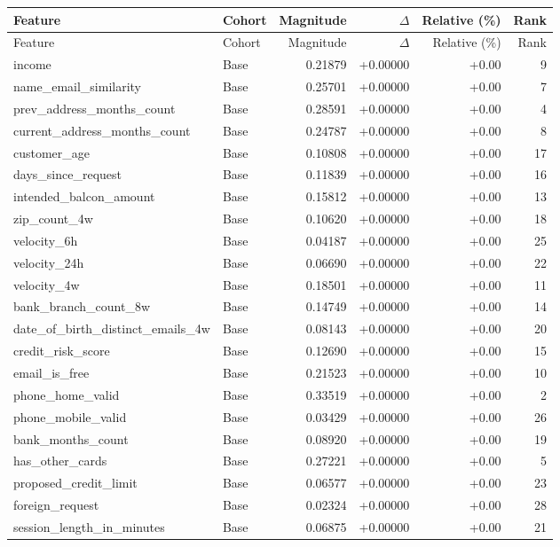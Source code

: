 \begin{longtable}{@{}llrrrr@{}}
\toprule
Feature & Cohort & Magnitude & $\Delta$ & Relative (\%) & Rank \\
\midrule
\endfirsthead
\toprule
Feature & Cohort & Magnitude & $\Delta$ & Relative (\%) & Rank \\
\midrule
\endhead
income & Base & 0.21879 & +0.00000 & +0.00 & 9 \\
name\_email\_similarity & Base & 0.25701 & +0.00000 & +0.00 & 7 \\
prev\_address\_months\_count & Base & 0.28591 & +0.00000 & +0.00 & 4 \\
current\_address\_months\_count & Base & 0.24787 & +0.00000 & +0.00 & 8 \\
customer\_age & Base & 0.10808 & +0.00000 & +0.00 & 17 \\
days\_since\_request & Base & 0.11839 & +0.00000 & +0.00 & 16 \\
intended\_balcon\_amount & Base & 0.15812 & +0.00000 & +0.00 & 13 \\
zip\_count\_4w & Base & 0.10620 & +0.00000 & +0.00 & 18 \\
velocity\_6h & Base & 0.04187 & +0.00000 & +0.00 & 25 \\
velocity\_24h & Base & 0.06690 & +0.00000 & +0.00 & 22 \\
velocity\_4w & Base & 0.18501 & +0.00000 & +0.00 & 11 \\
bank\_branch\_count\_8w & Base & 0.14749 & +0.00000 & +0.00 & 14 \\
date\_of\_birth\_distinct\_emails\_4w & Base & 0.08143 & +0.00000 & +0.00 & 20 \\
credit\_risk\_score & Base & 0.12690 & +0.00000 & +0.00 & 15 \\
email\_is\_free & Base & 0.21523 & +0.00000 & +0.00 & 10 \\
phone\_home\_valid & Base & 0.33519 & +0.00000 & +0.00 & 2 \\
phone\_mobile\_valid & Base & 0.03429 & +0.00000 & +0.00 & 26 \\
bank\_months\_count & Base & 0.08920 & +0.00000 & +0.00 & 19 \\
has\_other\_cards & Base & 0.27221 & +0.00000 & +0.00 & 5 \\
proposed\_credit\_limit & Base & 0.06577 & +0.00000 & +0.00 & 23 \\
foreign\_request & Base & 0.02324 & +0.00000 & +0.00 & 28 \\
session\_length\_in\_minutes & Base & 0.06875 & +0.00000 & +0.00 & 21 \\

\end{longtable}
